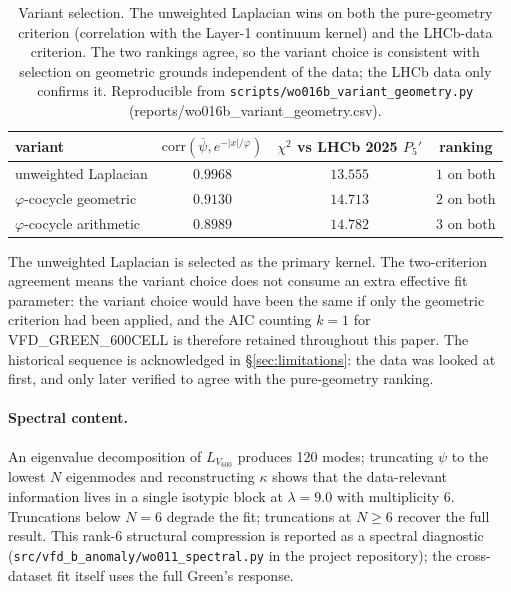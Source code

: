\begin{table}[h]
\centering
\small
\begin{tabular}{lccc}
\toprule
variant & $\mathrm{corr}(\overline{\psi}, e^{-|x|/\varphi})$ &
        $\chi^{2}$ vs LHCb 2025 $P_{5}'$ &
        ranking \\
\midrule
unweighted Laplacian          & $\mathbf{0.9968}$ & $\mathbf{13.555}$ & $1$ on both \\
$\varphi$-cocycle geometric    & $0.9130$ & $14.713$ & $2$ on both \\
$\varphi$-cocycle arithmetic   & $0.8989$ & $14.782$ & $3$ on both \\
\bottomrule
\end{tabular}
\caption{Variant selection. The unweighted Laplacian wins on both the
pure-geometry criterion (correlation with the Layer-1 continuum
kernel) and the LHCb-data criterion. The two rankings agree, so the
variant choice is consistent with selection on geometric grounds
independent of the data; the LHCb data only confirms it.
Reproducible from \texttt{scripts/wo016b\_variant\_geometry.py}
(reports/wo016b\_variant\_geometry.csv).}
\label{tab:variant_selection}
\end{table}

The unweighted Laplacian is selected as the primary kernel. The
two-criterion agreement means the variant choice does not consume an
extra effective fit parameter: the variant choice would have been the
same if only the geometric criterion had been applied, and the AIC
counting $k=1$ for VFD\_GREEN\_600CELL is therefore retained
throughout this paper. The historical sequence is acknowledged in
\S\ref{sec:limitations}: the data was looked at first, and only later
verified to agree with the pure-geometry ranking.

\paragraph{Spectral content.} An eigenvalue decomposition of
$L_{V_{600}}$ produces 120 modes; truncating $\psi$ to the lowest
$N$ eigenmodes and reconstructing $\kappa$ shows that the data-relevant
information lives in a single isotypic block at $\lambda=9.0$ with
multiplicity 6. Truncations below $N=6$ degrade the fit; truncations
at $N\geq 6$ recover the full result. This rank-6 structural
compression is reported as a spectral diagnostic
(\texttt{src/vfd\_b\_anomaly/wo011\_spectral.py} in the project
repository); the cross-dataset fit itself uses the full Green's
response.

